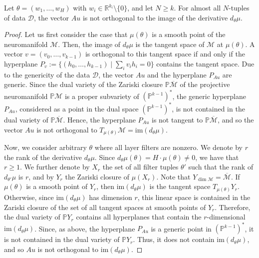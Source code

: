 \documentclass[10pt,a4paper]{amsart}
\begin{document}
\begin{lemma}
\label{lem:technical}
    Let $\theta = (w_1, \ldots, w_H)$ with $w_i \in \mathbb{R}^{k_i} \setminus \{ 0 \}$, and let $N \geq k$.
    For almost all $N$-tuples of data $\mathcal{D}$, the vector $Au$ is not orthogonal to the image of the derivative $d_\theta \mu$.
\end{lemma}

\begin{proof}
    Let us first consider the case that $\mu(\theta)$ is a smooth point of the neuromanifold $\mathcal{M}$.
    Then, the image of $d_\theta \mu$ is the tangent space of $\mathcal{M}$ at $\mu(\theta)$.
    A vector $v=(v_0, \ldots, v_{k-1})$ is orthogonal to this tangent space if and only if the hyperplane 
    $P_v := \{ (h_0, \ldots, h_{k-1}) \mid \sum_i v_i h_i=0 \}$ contains the tangent space.
    Due to the genericity of the data $\mathcal{D}$, the vector $Au$ and the hyperplane $P_{Au}$ are generic. 
    Since the dual variety of the Zariski closure $\mathbb{P}\overline{\mathcal{M}}$ of the projective neuromanifold $\mathbb{P}\mathcal{M}$ is a proper subvariety of $(\mathbb{P}^{k-1})^\ast$, the generic hyperplane $P_{Au}$, considered as a point in the dual space $(\mathbb{P}^{k-1})^\ast$, is not contained in the dual variety of $\mathbb{P}\overline{\mathcal{M}}$.
    Hence, the hyperplane $P_{Au}$ is not tangent to $\mathbb{P}\overline{\mathcal{M}}$, and so the vector $Au$ is not orthogonal 
    to $T_{\mu(\theta)} \mathcal{M} = \mathrm{im}(d_\theta \mu)$.
    
    Now, we consider  arbitrary $\theta$ where all layer filters are nonzero.
    We denote by $r$ the rank of the derivative $d_\theta \mu$.
    Since $d_\theta \mu (\theta) = H \cdot  \mu(\theta) \neq 0$, we have that $r \geq 1$.
    We further denote by $X_r$ the set of all filter tuples $\theta'$ such that the rank of $d_{\theta'}\mu$ is $r$, and by $Y_r$ the Zariski closure of $\mu(X_r)$.
    Note that $Y_{\dim \mathcal{M}} = \overline{\mathcal{M}}$.
    If $\mu(\theta)$ is a smooth point of $Y_r$, then $\mathrm{im}(d_\theta \mu)$ is the tangent space $T_{\mu(\theta)} Y_r$.
    Otherwise, since $\mathrm{im}(d_\theta \mu)$ has dimension $r$, this linear space is contained in the Zariski closure of the set of all tangent spaces at smooth points of $Y_r$.
    Therefore, the dual variety of $\mathbb{P} Y_r$ contains all hyperplanes that contain the $r$-dimensional $\mathrm{im}(d_\theta \mu)$.
    Since, as above, the hyperplane $P_{Au}$ is a generic point in $(\mathbb{P}^{k-1})^\ast$, it is not contained in the dual variety of $\mathbb{P} Y_r$.
    Thus, it does not contain $\mathrm{im}(d_\theta \mu)$, and so $Au$ is not orthogonal to $\mathrm{im}(d_\theta \mu)$.
\end{proof}
\end{document}
